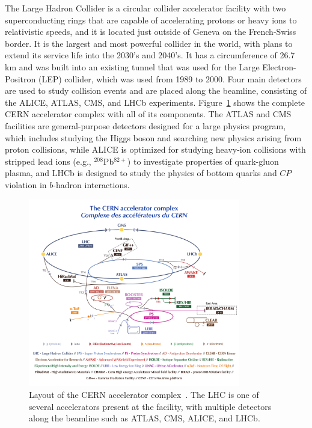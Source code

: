 The Large Hadron Collider is a circular collider accelerator facility with two superconducting rings that are capable of accelerating protons or heavy ions to relativistic speeds, and it is located just outside of Geneva on the French-Swiss border.
It is the largest and most powerful collider in the world, with plans to extend its service life into the 2030's and 2040's.
It has a circumference of 26.7 km and was built into an existing tunnel that was used for the Large Electron-Positron (LEP) collider, which was used from 1989 to 2000.
Four main detectors are used to study collision events and are placed along the beamline, consisting of the ALICE, ATLAS, CMS, and LHCb experiments.
Figure~\ref{fig:CERN} shows the complete CERN accelerator complex with all of its components.
The ATLAS and CMS facilities are general-purpose detectors designed for a large physics program, which includes studying the Higgs boson and searching new physics arising from proton collisions, while ALICE is optimized for studying heavy-ion collisions with stripped lead ions (e.g., $^{208}$Pb$^{82+}$) to investigate properties of quark-gluon plasma, and LHCb is designed to study the physics of bottom quarks and $CP$ violation in $b$-hadron interactions.

\begin{figure}[htbp]
  \centering
  \includegraphics[width=0.825\textwidth]{fig/experiment/CCC-v2018-print-v2.pdf}
  \caption[
    Layout of the CERN accelerator complex.
    The LHC is one of several accelerators present at the facility, with multiple detectors along the beamline such as ATLAS, CMS, ALICE, and LHCb.
  ]{
    Layout of the CERN accelerator complex~\cite{Mobs:2636343}.
    The LHC is one of several accelerators present at the facility, with multiple detectors along the beamline such as ATLAS, CMS, ALICE, and LHCb.
  }
  \label{fig:CERN}
\end{figure}


